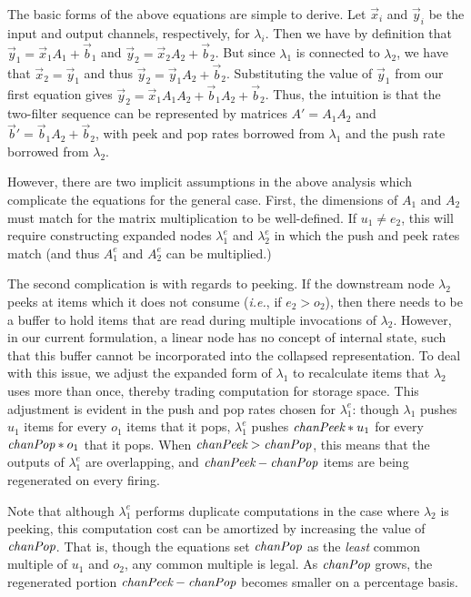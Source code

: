 The basic forms of the above equations are simple to derive.  Let
${\vec x}_i$ and ${\vec y}_i$ be the input and output channels, respectively, for
$\lambda_i$.  Then we have by definition that ${\vec y}_1 = {\vec x}_1 A_1 + {\vec b}_1$
and ${\vec y}_2 = {\vec x}_2 A_2 + {\vec b}_2$.  But since $\lambda_1$ is connected to
$\lambda_2$, we have that ${\vec x}_2 = {\vec y}_1$ and thus 
${\vec y}_2 = {\vec y}_1 A_2 + {\vec b}_2$.
Substituting the value of ${\vec y}_1$ from our first equation gives ${\vec y}_2 =
{\vec x}_1 A_1 A_2 + {\vec b}_1 A_2 + {\vec b}_2$.  Thus, the intuition is that the
two-filter sequence can be represented by matrices $A' = A_1 A_2$
and ${\vec b}' = {\vec b}_1 A_2 + {\vec b}_2$, with peek and pop rates borrowed from
$\lambda_1$ and the push rate borrowed from $\lambda_2$.

However, there are two implicit assumptions in the above analysis
which complicate the equations for the general case.  First, the
dimensions of $A_1$ and $A_2$ must match for the matrix multiplication
to be well-defined.  If $u_1 \ne e_2$, this will require constructing
expanded nodes $\lambda_1^e$ and $\lambda_2^e$ in which the push and
peek rates match (and thus $A_1^e$ and $A_2^e$ can be multiplied.)

The second complication is with regards to peeking.  If the downstream
node $\lambda_2$ peeks at items which it does not consume ({\it i.e.},
if $e_2 > o_2$), then there needs to be a buffer to hold items that
are read during multiple invocations of $\lambda_2$.  However, in our
current formulation, a linear node has no concept of internal state,
such that this buffer cannot be incorporated into the collapsed
representation.  To deal with this issue, we adjust the expanded form
of $\lambda_1$ to recalculate items that $\lambda_2$ uses more than
once, thereby trading computation for storage space.  This adjustment
is evident in the push and pop rates chosen for $\lambda_1^e$: though
$\lambda_1$ pushes $u_1$ items for every $o_1$ items that it pops,
$\lambda_1^e$ pushes $\mbox{\it chanPeek}*u_1$ for every $\mbox{\it chanPop}*o_1$
that it pops.  When $\mbox{\it chanPeek}>\mbox{\it chanPop}$, this means that the
outputs of $\lambda_1^e$ are overlapping, and
$\mbox{\it chanPeek}-\mbox{\it chanPop}$ items are being regenerated on every
firing.

Note that although $\lambda_1^e$ performs duplicate computations in
the case where $\lambda_2$ is peeking, this computation cost can be
amortized by increasing the value of $\mbox{\it chanPop}$.  That is, though
the equations set $\mbox{\it chanPop}$ as the {\it least} common multiple of
$u_1$ and $o_2$, any common multiple is legal.  As $\mbox{\it chanPop}$
grows, the regenerated portion $\mbox{\it chanPeek}-\mbox{\it chanPop}$ becomes
smaller on a percentage basis.

